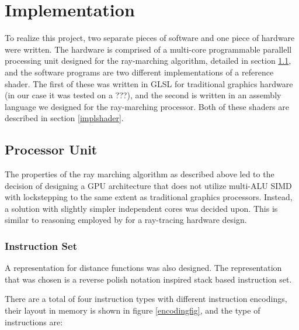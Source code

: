 \chapter{Implementation}
	
	To realize this project, two separate pieces of software and one piece of
	hardware were written. The hardware is comprised of a multi-core
	programmable parallell processing unit designed for the ray-marching
	algorithm, detailed in section \ref{implproc}, and the software programs
	are two different implementations of a reference shader.  The first of
	these was written in GLSL for traditional graphics hardware (in our case it
	was tested on a ???), and the second is written in an assembly language we
	designed for the ray-marching processor. Both of these shaders are
	described in section \ref{implshader}.
	
	\section{Processor Unit} \label{implproc}

		The properties of the ray marching algorithm as described above led to
		the decision of designing a GPU architecture that does not utilize
		multi-ALU SIMD with lockstepping to the same extent as traditional
		graphics processors. Instead, a solution with slightly simpler
		independent cores was decided upon. This is similar to reasoning
		employed by \cite{Woop2005} for a ray-tracing hardware design.
	
		\subsection{Instruction Set}

			A representation for distance functions was also designed. The
			representation that was chosen is a reverse polish notation
			inspired stack based instruction set.
	
			There are a total of four instruction types with different
			instruction encodings, their layout in memory is shown in figure
			\ref{encodingfig}, and the type of instructions are:


